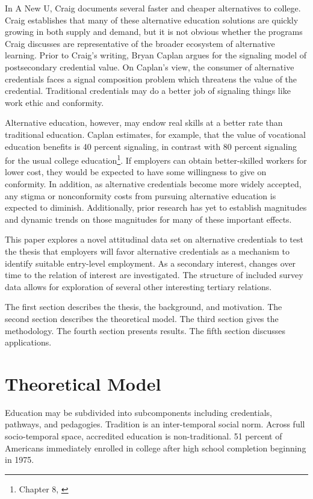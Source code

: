 \documentclass[AER]{./aea-latex-templates/AEA}
\begin{document}
In A New U, Craig documents several faster and cheaper alternatives to
college\cite{craig_2018}. Craig establishes that many of these alternative education
solutions are quickly growing in both supply and demand, but it is not
obvious whether the programs Craig discusses are representative of the
broader ecosystem of alternative learning. Prior to Craig’s writing, Bryan
Caplan argues for the signaling model of postsecondary credential value\cite{caplan2018case}.
On Caplan’s view, the consumer of alternative credentials faces a signal
composition problem which threatens the value of the credential.
Traditional credentials may do a better job of signaling things like work
ethic and conformity.

Alternative education, however, may endow real skills at a better rate
than traditional education. Caplan estimates, for example, that the value
of vocational education benefits is 40 percent signaling, in contrast with 80 percent
signaling for the usual college education\footnote{Chapter 8, \cite{caplan2018case}}. If employers can obtain
better-skilled workers for lower cost, they would be expected to have some
willingness to give on conformity. In addition, as alternative credentials
become more widely accepted, any stigma or nonconformity costs from
pursuing alternative education is expected to diminish. Additionally,
prior research has yet to establish magnitudes and dynamic trends on those
magnitudes for many of these important effects.

This paper explores a novel attitudinal data set on alternative
credentials to test the thesis that employers will favor
alternative credentials as a mechanism to identify suitable entry-level
employment. As a secondary interest, changes over time to the relation of
interest are investigated. The structure of included survey data allows
for exploration of several other interesting tertiary relations.

The first section describes the thesis, the background, and motivation. The
second section describes the theoretical model. The third section gives the
methodology. The fourth section presents results. The fifth section
discusses applications.

\section{Theoretical Model}

Education may be subdivided into subcomponents including credentials, pathways,
and pedagogies. Tradition is an inter-temporal social norm. Across
full socio-temporal space, accredited education is non-traditional. 51
percent of Americans immediately enrolled in college after high school completion
beginning in 1975\cite{aud2013condition}.
\end{document}
